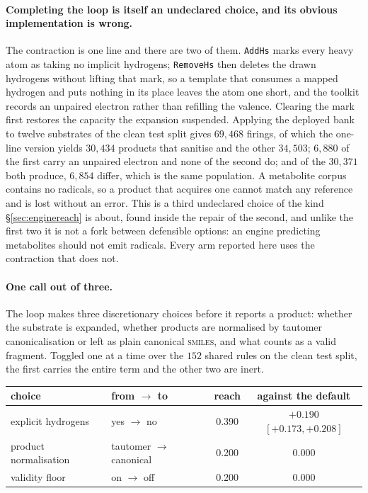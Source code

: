 \paragraph{Completing the loop is itself an undeclared choice, and its obvious implementation is
wrong.} The contraction is one line and there are two of them. \texttt{AddHs} marks every heavy atom
as taking no implicit hydrogens; \texttt{RemoveHs} then deletes the drawn hydrogens without lifting
that mark, so a template that consumes a mapped hydrogen and puts nothing in its place leaves the
atom one short, and the toolkit records an unpaired electron rather than refilling the valence.
Clearing the mark first restores the capacity the expansion suspended. Applying the deployed bank to
twelve substrates of the clean test split gives $69{,}468$ firings, of which the one-line version
yields $30{,}434$ products that sanitise and the other $34{,}503$; $6{,}880$ of the first carry an
unpaired electron and none of the second do; and of the $30{,}371$ both produce, $6{,}854$ differ,
which is the same population. A metabolite corpus contains no radicals, so a product that acquires
one cannot match any reference and is lost without an error. This is a third undeclared choice of
the kind \S\ref{sec:enginereach} is about, found inside the repair of the second, and unlike the
first two it is not a fork between defensible options: an engine predicting metabolites should not
emit radicals. Every arm reported here uses the contraction that does not.

\paragraph{One call out of three.} The loop makes three discretionary choices before it reports a
product: whether the substrate is expanded, whether products are normalised by tautomer
canonicalisation or left as plain canonical \textsc{smiles}, and what counts as a valid fragment.
Toggled one at a time over the $152$ shared rules on the clean test split, the first carries the
entire term and the other two are inert.

\begin{center}
\begin{tabular}{llcc}
\toprule
choice & from $\to$ to & reach & against the default \\
\midrule
explicit hydrogens    & yes $\to$ no             & 0.390 & $+0.190$ $[+0.173,+0.208]$ \\
product normalisation & tautomer $\to$ canonical & 0.200 & $0.000$ \\
validity floor        & on $\to$ off             & 0.200 & $0.000$ \\
\bottomrule
\end{tabular}
\end{center}

